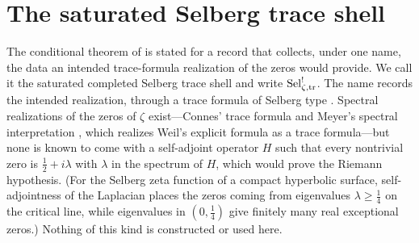 \section{The saturated Selberg trace shell}
\label{sec:sat_sel_shell}

The conditional theorem of  is stated for a
record that collects, under one name, the data an intended
trace-formula realization of the zeros would provide.  We call it the
saturated completed Selberg trace shell and write \(\mathrm{Sel}^{!}_{\zeta,\mathrm{tr}}\).  The name records the intended realization, through a trace formula of
Selberg type \citep{Selberg1956,Hejhal1976,Iwaniec2002}.  Spectral realizations of the zeros of \(\zeta\) exist---Connes' trace
formula \citep{Connes1999} and Meyer's spectral interpretation
\citep{Meyer2005}, which realizes Weil's explicit formula
\citep{Weil1952} as a trace formula---but none is known to come with a self-adjoint operator \(H\) such that
every nontrivial zero is \(\frac12+i\lambda\) with \(\lambda\) in the spectrum
of \(H\), which would prove the Riemann hypothesis.  (For the Selberg zeta function of a compact hyperbolic
surface, self-adjointness of the Laplacian places the zeros coming from
eigenvalues \(\lambda\geq\frac14\) on the critical line, while eigenvalues
in \((0,\frac14)\) give finitely many real exceptional zeros.)  Nothing of this kind is constructed or used here.


